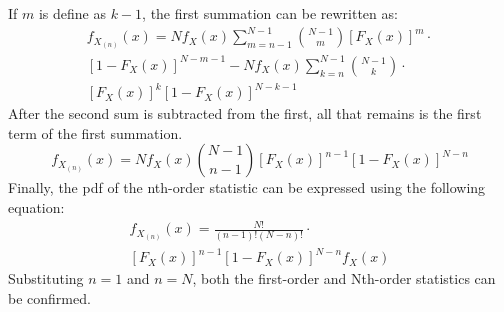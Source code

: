 \documentclass[conference]{IEEEtran}
\begin{document}
If $m$ is define as $k-1$, the first summation can be rewritten as:
\begin{equation}
\begin{gathered}
f_{X_{(n)}}(x) = Nf_X(x)\sum_{m=n-1}^{N-1}\binom{N-1}{m}[F_X(x)]^{m}\cdot\\
[1-F_X(x)]^{N-m-1} - Nf_X(x)\sum_{k=n}^{N-1}\binom{N-1}{k}\cdot\\
[F_X(x)]^{k}[1-F_X(x)]^{N-k-1}
\end{gathered}
\end{equation}
After the second sum is subtracted from the first, all that remains is the first term of the first summation.
\begin{equation}
f_{X_{(n)}}(x) = Nf_X(x)\binom{N-1}{n-1}[F_X(x)]^{n-1}[1-F_X(x)]^{N-n}
\end{equation}
Finally, the pdf of the nth-order statistic can be expressed using the following equation:
\begin{equation}
\begin{gathered}
f_{X_{(n)}}(x) = \frac{N!}{(n-1)!(N-n)!}\cdot\\
[F_X(x)]^{n-1}[1-F_X(x)]^{N-n}f_X(x)
\end{gathered}
\end{equation}
Substituting $n=1$ and $n=N$, both the first-order and Nth-order statistics can be confirmed. 
\end{document}

